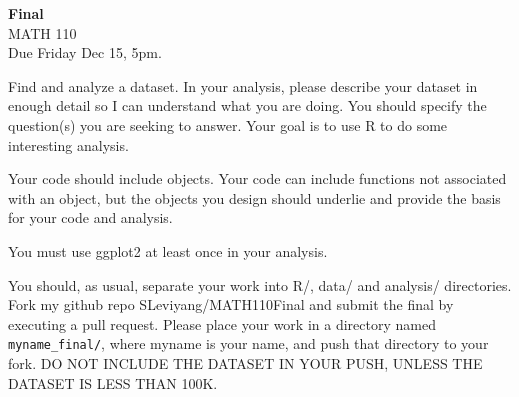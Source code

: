 \documentclass{article}
\begin{document}
\renewcommand{\a}{\textbf{a}}
\renewcommand{\b}{\textbf{b}}
\renewcommand{\d}{\textbf{d}}
\newcommand{\e}{\textbf{e}}

\large

\begin{center}
\textbf{Final} \\  
MATH 110\\
Due Friday Dec 15, 5pm.
\end{center}

\medskip

Find and analyze a dataset.   In your analysis, please describe your dataset in enough detail so I can understand what you are doing.  You should specify the question(s) you are seeking to answer.   Your goal is to use R to do some interesting analysis.   

\vspace{.3cm}

Your code should include objects.  Your code can include functions not associated with an object, but the objects you design should underlie and provide the basis for your code and analysis.  

\vspace{.3cm}

You must use ggplot2 at least once in your analysis. 

\vspace{.3cm}

You should, as usual, separate your work into R/, data/ and analysis/ directories.   Fork my github repo SLeviyang/MATH110Final and submit the final by executing a pull request.  Please place your work in a directory named \verb+myname_final/+, where myname is your name, and push that directory to your fork.   DO NOT INCLUDE THE DATASET IN YOUR PUSH, UNLESS THE DATASET IS LESS THAN 100K.  
\end{document}
